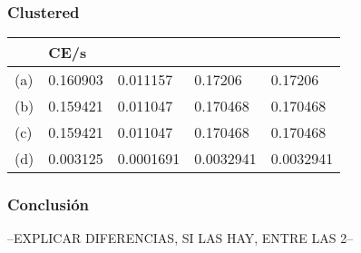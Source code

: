 \subsubsection{Clustered}
			
\begin{tabular}{| L | L | L | L | L |}
    \hline
     & CE/s &  &  &  \\ \hline
    (a) & 0.160903 & 0.011157 & 0.17206 & 0.17206 \\ \hline
    (b) & 0.159421 & 0.011047 & 0.170468 & 0.170468 \\ \hline
    (c) & 0.159421 & 0.011047 & 0.170468 & 0.170468 \\ \hline
    (d) & 0.003125 & 0.0001691 & 0.0032941 & 0.0032941 \\ \hline   
\end{tabular}	
		
		


\subsubsection{Conclusión}

--EXPLICAR DIFERENCIAS, SI LAS HAY, ENTRE LAS 2--
